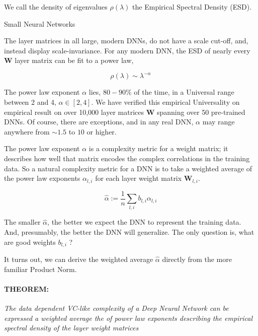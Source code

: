 We call the density of eigenvalues $\rho(\lambda)$ the Empirical Spectral Density (ESD).  

Small Neural Networks 

The layer matrices in all large, modern DNNs, do not have a scale cut-off, and, instead display scale-invariance.  
For any modern DNN, the ESD of nearly every \ $\mathbf{W}$ layer matrix can be fit to a power law,

$$\rho(\lambda)\sim\lambda^{-\alpha}$$

The power law exponent $\alpha$ lies, $80-90\%$ of the time, in a Universal range between 2 and 4, $\alpha\in[2,4]$.
We have verified this empirical Universality on empirical result on over 10,000 layer matrices $\mathbf{W}$ spanning over 50 pre-trained DNNs.
Of course, there are exceptions, and in any real DNN,  $\alpha$ may range anywhere from $\sim1.5$ to $10$ or higher.  

The power law exponent $\alpha$ is a complexity metric for a weight matrix; it describes how well that matrix encodes the complex correlations in the training data.
So a natural complexity metric for a DNN is to take a weighted average of the power law exponents $\alpha_{l,i}$ for each layer weight matrix $\mathbf{W}_{l,i}$.

$$\hat{\alpha}:=\dfrac{1}{n}\sum_{l,i}b_{l,i}\alpha_{l,i}$$

The smaller $\hat{\alpha}$, the better we expect the DNN to represent the training data. And, presumably, the better the DNN will generalize.
The only question is, what are good weights $b_{l,i}$ ?

It turns out, we can derive the weighted average $\hat{\alpha}$ directly from the more familiar Product Norm.



\paragraph{THEOREM:} \emph{The data dependent VC-like complexity of a Deep Neural Network can be expressed a weighted average the of power law exponents describing the empirical spectral density of the layer weight matrices}

